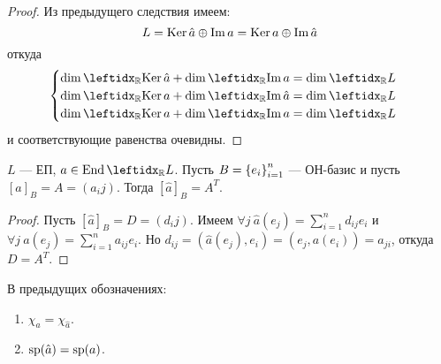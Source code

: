 \begin{proof}
    Из предыдущего следствия имеем: $$L = \operatorname{Ker} \hat{a} \oplus \operatorname{Im} a = \operatorname{Ker} a \oplus \operatorname{Im} \hat{a}$$
    откуда $$\begin{cases}
        \dim \lsub{\mathbb{R}}{\ker \hat{a}} + \dim \lsub{\mathbb{R}}{\im a} = \dim \lsub{\mathbb{R}}{L} \\
        \dim \lsub{\mathbb{R}}{\ker a} + \dim \lsub{\mathbb{R}}{\im \hat{a}} = \dim \lsub{\mathbb{R}}{L} \\
        \dim \lsub{\mathbb{R}}{\ker a} + \dim \lsub{\mathbb{R}}{\im a} = \dim \lsub{\mathbb{R}}{L}
    \end{cases}$$
    и соответствующие равенства очевидны.
\end{proof}

\begin{thm*}
    $L$ --- ЕП, $a \in \End \lsub{\mathbb{R}}{L}$. Пусть $B = \left\{e_i\right\}_{i=1}^{n}$ --- ОН-базис и пусть $[a]_B = A = (a_ij)$. Тогда $[\hat{a}]_B = A^T$.
\end{thm*}

\begin{proof}
    Пусть $[\hat{a}]_B = D = (d_ij)$. Имеем $\forall j\ \hat{a}(e_j) = \sum_{i=1}^n d_{ij} e_i$ и $\forall j\ a(e_j) = \sum_{i=1}^n a_{ij} e_i$. Но $d_{ij} = (\hat{a}(e_j), e_i) = (e_j, a(e_i)) = a_{ji}$, откуда $D = A^T$.
\end{proof}

\begin{cor*}
    В предыдущих обозначениях:
    \begin{enumerate}
        \item $\chi_a = \chi_{\hat{a}}$.
        \item $\operatorname{sp}(\hat{a}) = \operatorname{sp}(a)$.
    \end{enumerate}
\end{cor*}